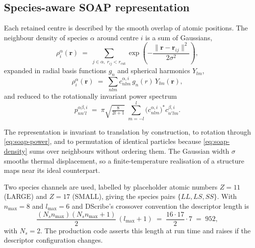 \subsection{Species-aware SOAP representation}
\label{sec:soap}

Each retained centre is described by the smooth overlap of atomic positions. The neighbour
density of species $\alpha$ around centre $i$ is a sum of Gaussians,
\begin{equation}
  \rho^{\alpha}_{i}(\bm{r}) \;=\;
  \sum_{j \in \alpha,\; r_{ij} < r_{\mathrm{cut}}}
  \exp\!\left(-\frac{\lVert \bm{r} - \bm{r}_{ij} \rVert^{2}}{2\sigma^{2}}\right),
  \label{eq:soap-density}
\end{equation}
expanded in radial basis functions $g_n$ and spherical harmonics $Y_{lm}$,
\begin{equation}
  \rho^{\alpha}_{i}(\bm{r}) \;=\; \sum_{nlm} c^{\alpha,i}_{nlm}\, g_n(r)\, Y_{lm}(\hat{\bm{r}}),
  \label{eq:soap-expansion}
\end{equation}
and reduced to the rotationally invariant power spectrum
\begin{equation}
  p^{\alpha\beta,i}_{nn'l} \;=\; \pi\sqrt{\tfrac{8}{2l+1}}\;
  \sum_{m=-l}^{l} \bigl(c^{\alpha,i}_{nlm}\bigr)^{*} c^{\beta,i}_{n'lm}.
  \label{eq:soap-power}
\end{equation}

The representation is invariant to translation by construction, to rotation through
\cref{eq:soap-power}, and to permutation of identical particles because
\cref{eq:soap-density} sums over neighbours without ordering them. The Gaussian width
$\sigma$ smooths thermal displacement, so a finite-temperature realisation of a structure
maps near its ideal counterpart.

Two species channels are used, labelled by placeholder atomic numbers $Z = 11$ (LARGE) and
$Z = 17$ (SMALL), giving the species pairs $\{LL, LS, SS\}$. With $n_{\max} = 8$ and
$l_{\max} = 6$ and DScribe's crossover convention the descriptor length is
\begin{equation}
  \frac{(N_s n_{\max})(N_s n_{\max} + 1)}{2}\,(l_{\max}+1)
  \;=\; \frac{16 \cdot 17}{2}\cdot 7 \;=\; 952 ,
  \label{eq:soap-dim}
\end{equation}
with $N_s = 2$. The production code asserts this length at run time and raises if the
descriptor configuration changes.

